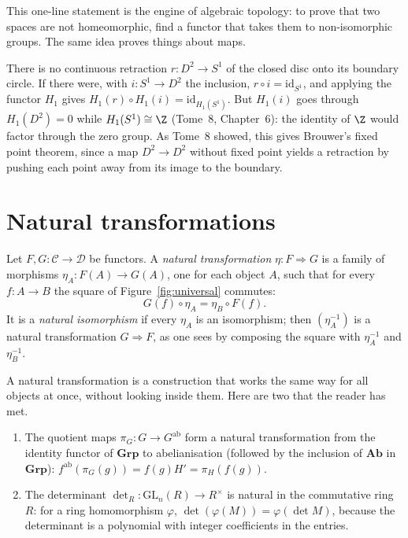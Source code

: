 This one-line statement is the engine of algebraic topology: to prove that two spaces are not homeomorphic, find a functor that takes them to non-isomorphic groups. The same idea
proves things about maps.

\begin{example}\label{ex:brouwer}
There is no continuous retraction $r\colon D^2\to S^1$ of the closed disc onto its boundary circle. If there were, with $i\colon S^1\to D^2$ the inclusion, $r\circ i=\mathrm{id}_{S^1}$, and applying
the functor $H_1$ gives $H_1(r)\circ H_1(i)=\mathrm{id}_{H_1(S^1)}$. But $H_1(i)$ goes through $H_1(D^2)=0$ while $H_1(S^1)\cong\Z$ (Tome~8, Chapter~6): the identity of $\Z$ would factor through
the zero group. As Tome~8 showed, this gives Brouwer's fixed point theorem, since a map $D^2\to D^2$ without fixed point yields a retraction by pushing each point away from its image to the boundary.
\end{example}

\section{Natural transformations}

\begin{definition}\label{def:nat}
Let $F,G\colon\mathcal C\to\mathcal D$ be functors. A \emph{natural transformation} $\eta\colon F\Rightarrow G$ is a family of morphisms $\eta_A\colon F(A)\to G(A)$, one for each object $A$, such that
for every $f\colon A\to B$ the square of Figure~\ref{fig:universal} commutes:
\[G(f)\circ\eta_A=\eta_B\circ F(f).\]
It is a \emph{natural isomorphism} if every $\eta_A$ is an isomorphism; then $(\eta_A^{-1})$ is a natural transformation $G\Rightarrow F$, as one sees by composing the square with $\eta_A^{-1}$ and $\eta_B^{-1}$.
\end{definition}

A natural transformation is a construction that works the same way for all objects at once, without looking inside them. Here are two that the reader has met.

\begin{example}\label{ex:nattrans}
\leavevmode
\begin{enumerate}[label=(\alph*)]
\item The quotient maps $\pi_G\colon G\to G^{\mathrm{ab}}$ form a natural transformation from the identity functor of $\mathbf{Grp}$ to abelianisation (followed by the inclusion of $\mathbf{Ab}$ in
$\mathbf{Grp}$): $f^{\mathrm{ab}}(\pi_G(g))=f(g)H'=\pi_H(f(g))$.
\item The determinant $\det_R\colon\mathrm{GL}_n(R)\to R^\times$ is natural in the commutative ring $R$: for a ring homomorphism $\varphi$, $\det(\varphi(M))=\varphi(\det M)$, because the
determinant is a polynomial with integer coefficients in the entries.
\end{enumerate}
\end{example}


